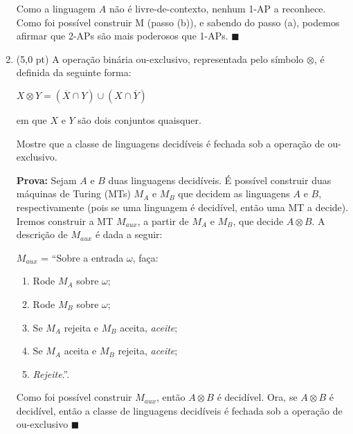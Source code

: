 \documentclass[12pt,a4paper,oneside]{article}
\begin{document}
\begin{enumerate}
{	Como a linguagem $A$ não é livre-de-contexto, nenhum 1-AP a reconhece. Como foi possível construir M (passo (b)), e sabendo do passo (a), podemos afirmar que 2-APs são mais poderosos que 1-APs. $\blacksquare$
	}

	\newpage
	
	\item (5,0 pt) A operação binária ou-exclusivo, representada pelo símbolo $\otimes$, é definida da seguinte forma:
	\begin{center}
		$X \otimes Y = (\overline{X} \cap Y) \cup (X \cap \overline{Y})$
	\end{center}
	em que $X$ e $Y$ são dois conjuntos quaisquer.
	
	Mostre que a classe de linguagens decidíveis é fechada sob a operação de ou-exclusivo.
	
	\vspace{0.3cm}
	
	{\color{blue}	
		{\bf Prova:} Sejam $A$ e $B$ duas linguagens decidíveis. É possível construir duas máquinas de Turing (MTs) $M_A$ e $M_B$ que decidem as linguagens $A$ e $B$, respectivamente (pois se uma linguagem é decidível, então uma  MT a decide). Iremos construir a MT $M_{aux}$, a partir de $M_A$ e $M_B$, que decide $A \otimes B$. A descrição de $M_{aux}$ é dada a seguir:
		
		$M_{aux}$ = ``Sobre a entrada $\omega$, faça:
		\begin{enumerate}
			\item Rode $M_A$ sobre $\omega$; 
			\item Rode $M_B$ sobre $\omega$; 
			\item Se $M_A$ rejeita e $M_B$ aceita, {\it aceite};
			\item Se $M_A$ aceita e $M_B$ rejeita, {\it aceite};
			\item {\it Rejeite}.''.
		\end{enumerate}
		
		Como foi possível construir $M_{aux}$, então $A \otimes B$ é decidível. Ora, se $A \otimes B$ é decidível, então a classe de linguagens decidíveis é fechada sob a operação de ou-exclusivo $\blacksquare$
	}

\end{enumerate}
\end{document}
